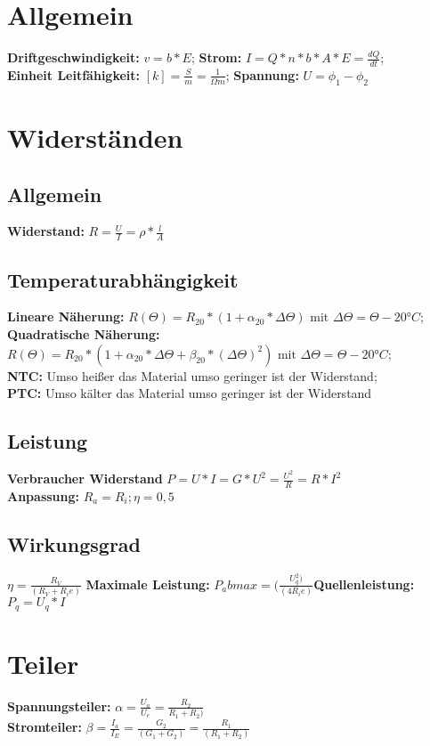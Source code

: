 \documentclass[10pt,a5paper]{article}
\author{Christian Böhm}
\begin{document}
\section{Allgemein}
\textbf{Driftgeschwindigkeit:} \ensuremath{v=b*E}; \textbf{Strom:} \ensuremath{I=Q*n*b*A*E=\frac{dQ}{dt}};\\ \textbf{Einheit Leitfähigkeit:} \ensuremath{[k]=\frac{S}{m}=\frac{1}{\Omega m}}; \textbf{Spannung:} \ensuremath{U=\phi_1-\phi_2}
\section{Widerständen}
\subsection{Allgemein}
\textbf{Widerstand:} \ensuremath{R=\frac{U}{I}=\rho *\frac{l}{A}}
\subsection{Temperaturabhängigkeit}
\textbf{Lineare Näherung:} \ensuremath{R(\Theta)=R_{20}*(1+\alpha_{20}*\Delta\Theta) \text{ mit } \Delta\Theta=\Theta-20°C};\\
\textbf{Quadratische Näherung:} \ensuremath{R(\Theta)=R_{20}*(1+\alpha_{20}*\Delta\Theta+\beta_{20}*(\Delta\Theta)^2) \text{ mit } \Delta\Theta=\Theta-20°C};\\
\textbf{NTC:} Umso heißer das Material umso geringer ist der Widerstand;\\ \textbf{PTC:} Umso kälter das Material umso geringer ist der Widerstand 
\subsection{Leistung}
\textbf{Verbraucher Widerstand} \ensuremath{P=U*I=G*U^2=\frac{U^2}{R}=R*I^2}\\\textbf{Anpassung:} \ensuremath{R_a=R_i;\eta=0,5}
\subsection{Wirkungsgrad}
\ensuremath{\eta=\frac{R_V}{(R_V+R_ie )}}
\textbf{Maximale Leistung: }\ensuremath{P_abmax=(\frac{U_q^2)}{(4R_ie )}}\textbf{Quellenleistung: }\ensuremath{P_q=U_q*I}

\section{Teiler}
\textbf{Spannungsteiler:} \ensuremath{\alpha= \frac{U_a}{U_e}= \frac{R_2}{R_1+R_2 )} }\\
\textbf{Stromteiler: }\ensuremath{\beta=\frac{I_a}{I_E} =\frac{G_2}{(G_1+G_2 )}=\frac{R_1}{(R_1+R_2 )}}  
\end{document}
